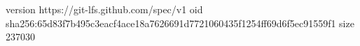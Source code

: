 version https://git-lfs.github.com/spec/v1
oid sha256:65d83f7b495c3eacf4ace18a7626691d7721060435f1254ff69d6f5ec91559f1
size 237030
